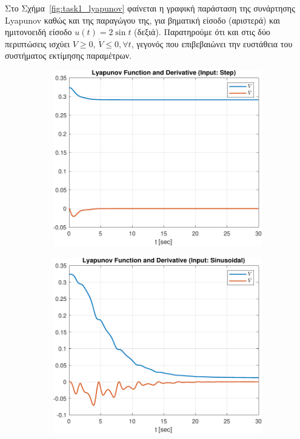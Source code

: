 \documentclass[a4paper,12pt]{article}
\begin{document}
Στο Σχήμα~\ref{fig:task1_lyapunov} φαίνεται η γραφική παράσταση της συνάρτησης 
Lyapunov καθώς και της παραγώγου της, για βηματική είσοδο 
(αριστερά) και ημιτονοειδή είσοδο $u(t) = 2 \sin t$ (δεξιά). Παρατηρούμε ότι και στις δύο περιπτώσεις 
ισχύει $V \geq 0, \, \dot{V} \leq 0, \forall t$, γεγονός που επιβεβαιώνει την ευστάθεια του συστήματος 
εκτίμησης παραμέτρων.

\begin{figure}[htbp]
  \centering
  \begin{subfigure}[b]{0.45\textwidth}
    \centering
    \includegraphics[width=\textwidth]{plot/task1_lyapunov_step.pdf}
    \caption{}
    \label{fig:task1_lyapunov_step}
  \end{subfigure}
  \hfill
  \begin{subfigure}[b]{0.45\textwidth}
    \centering
    \includegraphics[width=\textwidth]{plot/task1_lyapunov_sinusoidal.pdf}

\end{subfigure}
\end{figure}
\end{document}
